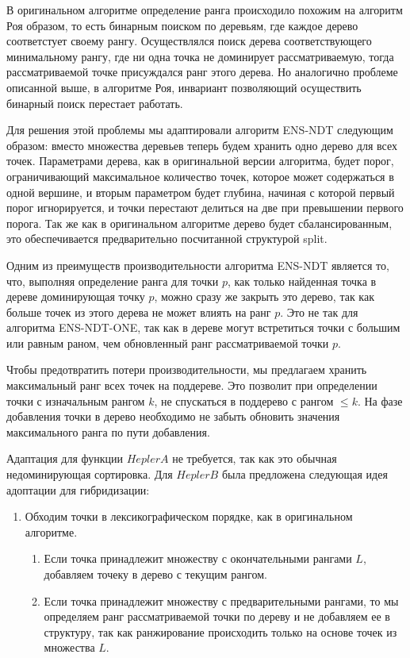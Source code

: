 В оригинальном алгоритме определение ранга происходило похожим на алгоритм Роя образом, то есть бинарным поиском по деревьям, где каждое дерево соответстует своему рангу. Осуществлялся поиск дерева соответствующего минимальному рангу, где ни одна точка не доминирует рассматриваемую, тогда рассматриваемой точке присуждался ранг этого дерева. Но аналогично проблеме описанной выше, в алгоритме Роя, инвариант позволяющий осуществить бинарный поиск перестает работать. 

Для решения этой проблемы мы адаптировали алгоритм ENS-NDT следующим образом: вместо множества деревьев теперь будем хранить одно дерево для всех точек. Параметрами дерева, как в оригинальной версии алгоритма, будет порог, ограничивающий максимальное количество точек, которое может содержаться в одной вершине, и вторым параметром будет глубина, начиная с которой первый порог игнорируется, и точки перестают делиться на две при превышении первого порога. Так же как в оригинальном алгоритме дерево будет сбалансированным, это обеспечивается предварительно посчитанной структурой split. 

Одним из преимуществ производительности алгоритма ENS-NDT является то, что, выполняя определение ранга для точки $p$, как только найденная точка в дереве доминирующая точку $p$, можно сразу же закрыть это дерево, так как больше точек из этого дерева не может влиять на ранг $p$. Это не так для алгоритма ENS-NDT-ONE, так как в дереве могут встретиться точки с большим или равным раном, чем обновленный ранг рассматриваемой точки $p$.

Чтобы предотвратить потери производительности, мы предлагаем хранить максимальный ранг всех точек на поддереве. Это позволит при определении точки с изначальным рангом $k$, не спускаться в поддерево с рангом $\leq k$. На фазе добавления точки в дерево необходимо не забыть обновить значения максимального ранга по пути добавления.

Адаптация для функции $HeplerA$ не требуется, так как это обычная недоминирующая сортировка. Для $HeplerB$ была предложена следующая идея адоптации для гибридизации: 
\begin{enumerate}
  \item Обходим точки в лексикографическом порядке, как в оригинальном алгоритме.
  \begin{enumerate}
      \item Если точка принадлежит множеству с окончательными рангами $L$, добавляем точеку в дерево с текущим рангом.
      \item Если точка принадлежит множеству с предварительными рангами, то мы определяем ранг рассматриваемой точки по дереву и не добавляем ее в структуру, так как ранжирование происходить только на основе точек из множества $L$.
  \end{enumerate}
\end{enumerate}

